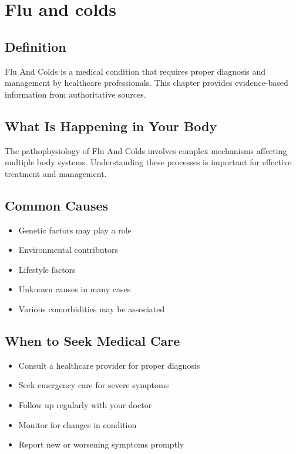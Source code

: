
\chapter{Flu and colds}

\section*{Definition}
Flu And Colds is a medical condition that requires proper diagnosis and management by healthcare professionals. This chapter provides evidence-based information from authoritative sources.

\section*{What Is Happening in Your Body}
The pathophysiology of Flu And Colds involves complex mechanisms affecting multiple body systems. Understanding these processes is important for effective treatment and management.

\section*{Common Causes}
\begin{itemize}
  \item Genetic factors may play a role
  \item Environmental contributors
  \item Lifestyle factors
  \item Unknown causes in many cases
  \item Various comorbidities may be associated
\end{itemize}

\section*{When to Seek Medical Care}
\begin{itemize}
  \item Consult a healthcare provider for proper diagnosis
  \item Seek emergency care for severe symptoms
  \item Follow up regularly with your doctor
  \item Monitor for changes in condition
  \item Report new or worsening symptoms promptly
\end{itemize}

